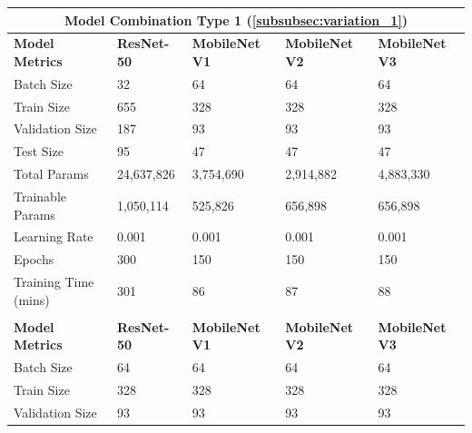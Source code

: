 \begin{table}[H]
\centering
\begin{tabularx}{\textwidth}{@{} *5{X} @{}}
\toprule
\multicolumn{5}{c}{\textbf{Model Combination Type 1 (\ref{subsubsec:variation_1})}}                                    \\ \midrule
\raggedright \textbf{Model Metrics}           & \textbf{ResNet-50} & \textbf{MobileNet V1} & \textbf{MobileNet V2} & \textbf{MobileNet V3} \\ \midrule
Batch Size           & 32          &   64           &   64           &   64           \\ \midrule
Train Size           & 655          &  328            & 328             &  328            \\  \midrule
Validation Size      & 187          &  93            &  93            & 93             \\ \midrule
Test Size            & 95          &   47           &   47           & 47             \\ \midrule
\raggedright Total Params     &   24,637,826        &  3,754,690            &    2,914,882          &   4,883,330           \\ \midrule
\raggedright Trainable Params &   1,050,114        &  525,826            &  656,898            &   656,898           \\ \midrule
Learning Rate        &  0.001         &  0.001            &  0.001            &  0.001            \\ \midrule
Epochs               &  300         &   150           &  150            &  150            \\ \midrule
Training Time (mins)       &  301         & 86             &  87            &     88         \\ \midrule
\addlinespace
\addlinespace
\midrule
\multicolumn{5}{c}{\textbf{Model Combination Type 2 (\ref{subsubsec:variation_2})}}                                    \\ \midrule
\raggedright \textbf{Model Metrics}           & \textbf{ResNet-50} & \textbf{MobileNet V1} & \textbf{MobileNet V2} & \textbf{MobileNet V3} \\ \midrule
Batch Size           &  64          &  64            &  64            &    64          \\ \midrule
Train Size           &  328         &  328            &  328            & 328             \\  \midrule
Validation Size      &  93         &   93           &   93           & 93             \\ \midrule

\end{tabularx}
\end{table}
